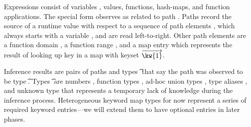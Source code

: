 Expressions \e{} consist of variables \x{}, values,
functions, hash-maps, and function applications.
The special form
\trackE{\e{}}{\inferpath{}}
observes {\e{}} as related to path {\inferpath{}}.
Paths \inferpath{} 
record the source of a runtime value with respect
to a sequence of path elements \pth{}, which always starts with
a variable \x{}, and are read left-to-right.
Other path elements are
a function domain \dompe{}, 
a function range \rngpe{},
and a map entry {}
which represents the result of looking up key {}
in a map with keyset ${\overrightarrow{\kw{1}}}$.

Inference results \restwoarrow{\inferpath{}}{\t{}}
are pairs of paths {\inferpath{}} and types \t{}
that say the path \inferpath{} was observed to be 
type \t{}.
Types \t{} are numbers \IntT{}, function types \arrow{\t{}}{\t{}},
ad-hoc union types \Union{\t{}}{\t{}},
type aliases \alias{},
and unknown type \UnknownT{} that represents
a temporary lack of knowledge during the inference process.
Heterogeneous keyword map types \HMappretty{\overrightarrow{\kw{}\ \t{}}}
for now represent a series of required keyword entries---we will extend
them to have optional entries in later phases.

